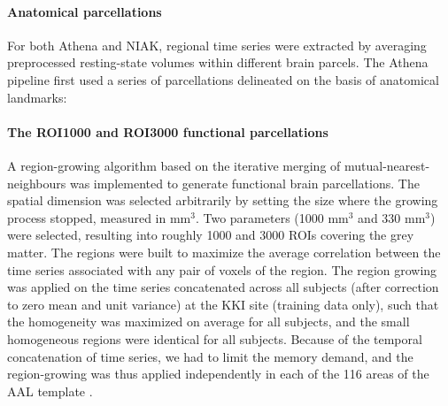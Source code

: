 \documentclass[preprint,12pt,5p]{elsarticle}
\begin{document}
\begin{itemize}

\paragraph{Anatomical parcellations} For both Athena and NIAK, regional time series were extracted by averaging preprocessed resting-state volumes within different brain parcels. The Athena pipeline first used a series of parcellations delineated on the basis of anatomical landmarks:


\paragraph{The ROI1000 and ROI3000 functional parcellations} A region-growing algorithm \citep{bellec2006identification} based on the iterative merging of mutual-nearest-neighbours was implemented to generate functional brain parcellations. The spatial dimension was selected arbitrarily by setting the size where the growing process stopped, measured in mm$^3$. Two parameters (1000 mm$^3$ and 330 mm$^3$) were selected, resulting into roughly 1000 and 3000 ROIs covering the grey matter. The regions were built to maximize the average correlation between the time series associated with any pair of voxels of the region. The region growing was applied on the time series concatenated across all subjects (after correction to zero mean and unit variance) at the KKI site (training data only), such that the homogeneity was maximized on average for all subjects, and the small homogeneous regions were identical for all subjects. Because of the temporal concatenation of time series, we had to limit the memory demand, and the region-growing was thus applied independently in each of the 116 areas of the AAL template \citep{tzourio2002automated}. 







\end{itemize}
\end{document}
